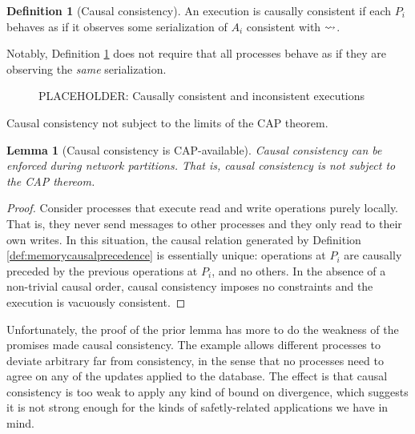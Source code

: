 \documentclass[]             %
{NASA}                       %
\newtheorem{lemma}[theorem]{Lemma}
\theoremstyle{definition}
\newtheorem{definition}[theorem]{Definition}
\begin{document}
\begin{definition}[Causal consistency]
  \label{def:causalconsistency}
  An execution is causally consistent if each $P_i$ behaves as if it
  observes some serialization of $A_i$ consistent with $\rightsquigarrow$.
\end{definition}

Notably, Definition \ref{def:causalconsistency} does not require that
all processes behave as if they are observing the \emph{same}
serialization.

\begin{figure}
  \begin{subfigure}{1\textwidth}
    \centering
    
    \caption{}
    \label{fig:smEx1L1}
  \end{subfigure}

  \begin{subfigure}{1\textwidth}
    
    \caption{}
    \label{fig:smEx5}
  \end{subfigure}

  \caption{PLACEHOLDER: Causally consistent and inconsistent executions}
  \label{fig:smCausal}
\end{figure}
\clearpage

Causal consistency not subject to the limits of the CAP theorem.

\begin{lemma}[Causal consistency is CAP-available]
  \label{thm:cap-causal}
  Causal consistency can be enforced during network partitions. That
  is, causal consistency is not subject to the CAP thereom.
\end{lemma}
\begin{proof}
  Consider processes that execute read and write operations purely
  locally. That is, they never send messages to other processes and
  they only read to their own writes. In this situation, the causal
  relation generated by Definition \ref{def:memorycausalprecedence} is
  essentially unique: operations at $P_i$ are causally preceded by the
  previous operations at $P_i$, and no others. In the absence of a
  non-trivial causal order, causal consistency imposes no constraints
  and the execution is vacuously consistent.
\end{proof}

Unfortunately, the proof of the prior lemma has more to do the
weakness of the promises made causal consistency. The example allows
different processes to deviate arbitrary far from consistency, in the
sense that no processes need to agree on any of the updates applied to
the database. The effect is that causal consistency is too weak to
apply any kind of bound on divergence, which suggests it is not strong
enough for the kinds of safetly-related applications we have in mind.
\end{document}
